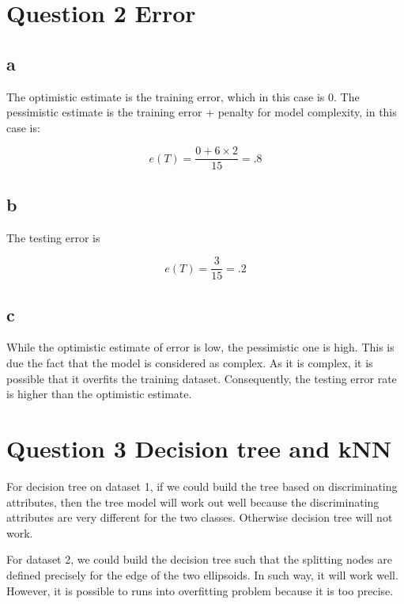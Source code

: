 \documentclass[paper=a4, fontsize=11pt]{scrartcl} %
\begin{document}
\section*{Question 2 Error}

\subsection*{a}

The optimistic estimate is the training error, which in this case is 0. The pessimistic estimate is the training error + penalty for model complexity, in this case is:

\begin{equation} \label{eq:solve}
e(T) = \frac{0 + 6 \times 2}{15} = .8			
\end{equation}

\subsection*{b}

The testing error is 

\begin{equation} \label{eq:2b}
e(T) = \frac{3}{15} = .2
\end{equation}

\subsection*{c}

While the optimistic estimate of error is low, the pessimistic one is high. This is due the fact that the model is considered as complex. As it is complex, it is possible that it overfits the training dataset. Consequently, the testing error rate is higher than the optimistic estimate.

\section*{Question 3 Decision tree and kNN}

For decision tree on dataset 1, if we could build the tree based on discriminating attributes, then the tree model will work out well because the discriminating attributes are very different for the two classes. Otherwise decision tree will not work. 

For dataset 2, we could build the decision tree such that the splitting nodes are defined precisely for the edge of the two ellipsoids. In such way, it will work well. However, it is possible to runs into overfitting problem because it is too precise.
\end{document}
